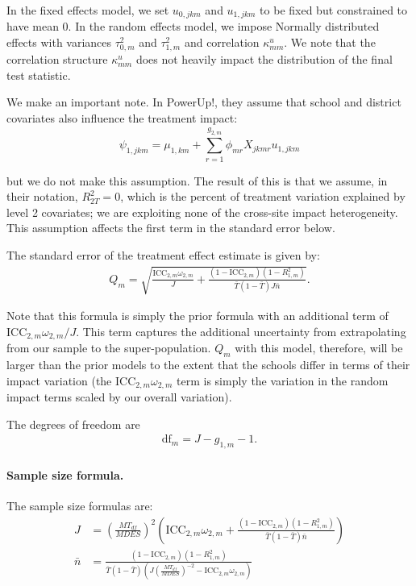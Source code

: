 \documentclass[12pt]{article}
\begin{document}
In the fixed effects model, we set $u_{0,jkm}$ and $u_{1,jkm}$ to be fixed but constrained to have mean 0.
In the random effects model, we impose Normally distributed effects with variances $\tau_{0,m}^2$ and $\tau_{1,m}^2$ and correlation $\kappa_{mm}^u$. We note that the correlation structure $\kappa_{mm}^u$ does not heavily impact the distribution of the final test statistic.

We make an important note. In PowerUp!, they assume that school and district covariates also influence the treatment impact:
$$ \psi_{1,jkm} = \mu_{1,km} + \sum_{r=1}^{g_{2,m}} \phi_{mr} X_{jkmr} u_{1,jkm}$$

but we do not make this assumption.
The result of this is that we assume, in their notation, $R_{2T}^2=0$, which is the percent of treatment variation explained by level 2 covariates; we are exploiting none of the cross-site impact heterogeneity.
This assumption affects the first term in the standard error below.

The standard error of the treatment effect estimate is given by:
\begin{align}Q_m = \sqrt{\frac{\text{ICC}_{2,m} \omega_{2,m}}{J} + \frac{(1-\text{ICC}_{2,m})(1-R^2_{1,m})}{\bar{T}(1 - \bar{T}) J \bar{n}}}.\end{align}

Note that this formula is simply the prior formula with an additional term of $\text{ICC}_{2,m} \omega_{2,m} / J$.
This term captures the additional uncertainty from extrapolating from our sample to the super-population.
$Q_m$ with this model, therefore, will be larger than the prior models to the extent that the schools differ in terms of their impact variation (the $\text{ICC}_{2,m} \omega_{2,m}$ term is simply the variation in the random impact terms scaled by our overall variation).

The degrees of freedom are
\begin{align}\text{df}_m = J - g_{1,m} - 1.\end{align}

\paragraph{Sample size formula.} 
The sample size formulas are:
\begin{align}
J &= \left(\frac{MT_{df}}{MDES}\right)^2 \left(\text{ICC}_{2,m} \omega_{2,m} + \frac{(1-\text{ICC}_{2,m})(1-R^2_{1,m})}{\bar{T}(1 - \bar{T}) \bar{n}} \right)\\
\bar{n} &= \frac{(1-\text{ICC}_{2,m})(1-R^2_{1,m})}{\bar{T}(1 - \bar{T})\left(J \left(\frac{MT_{df}}{MDES}\right)^{-2} - \text{ICC}_{2,m} \omega_{2,m}\right)}
\end{align}
\end{document}
